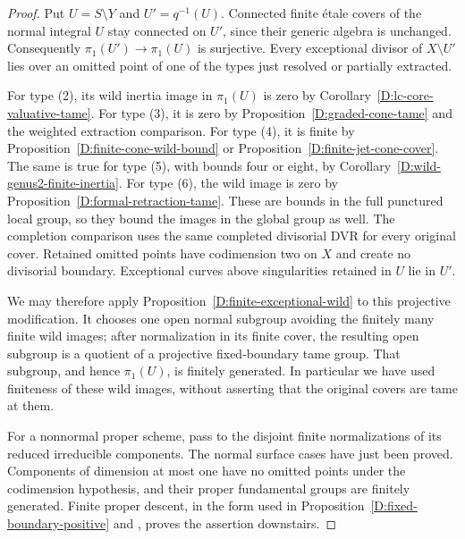 \begin{proof}
Put $U=S\setminus Y$ and $U'=q^{-1}(U)$.  Connected finite
\'etale covers of the normal integral $U$ stay connected on
$U'$, since their generic algebra is unchanged.  Consequently
$\pi_1(U')\to\pi_1(U)$ is surjective.  Every exceptional
divisor of $X\setminus U'$ lies over an omitted point of one
of the types just resolved or partially extracted.

For type (2), its wild inertia image in $\pi_1(U)$ is zero by
Corollary~\ref{D:lc-core-valuative-tame}.  For type (3), it is
zero by Proposition~\ref{D:graded-cone-tame} and the weighted
extraction comparison.  For type (4), it is finite by
Proposition~\ref{D:finite-cone-wild-bound} or
Proposition~\ref{D:finite-jet-cone-cover}.  The same is true
for type (5), with bounds four or eight, by
Corollary~\ref{D:wild-genus2-finite-inertia}.
For type (6), the wild image is zero by
Proposition~\ref{D:formal-retraction-tame}.  These are bounds
in the full punctured local group, so they bound the images
in the global group as well.  The completion comparison uses
the same completed divisorial DVR for every original cover.
Retained omitted points have codimension two on $X$ and create
no divisorial boundary.  Exceptional curves above singularities
retained in $U$ lie in $U'$.

We may therefore apply Proposition~\ref{D:finite-exceptional-wild}
to this projective modification.  It chooses one open normal
subgroup avoiding the finitely many finite wild images; after
normalization in its finite cover, the resulting open subgroup
is a quotient of a projective fixed-boundary tame group.
That subgroup, and hence $\pi_1(U)$, is finitely generated.
In particular we have used finiteness of these wild images,
without asserting that the original covers are tame at them.

For a nonnormal proper scheme, pass to the disjoint finite
normalizations of its reduced irreducible components.  The
normal surface cases have just been proved.  Components of
dimension at most one have no omitted points under the
codimension hypothesis, and their proper fundamental groups
are finitely generated.  Finite proper descent, in the form
used in Proposition~\ref{D:fixed-boundary-positive} and
\cite[IX, Corollary 5.2]{SGA1}, proves the assertion downstairs.
\end{proof}

